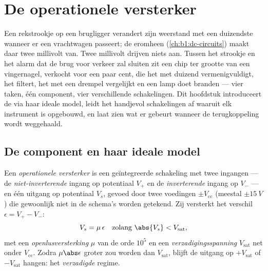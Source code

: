 \chapter{De operationele versterker}\label{ch:b1:operational-amplifier}

Een rekstrookje op een brugligger verandert zijn weerstand met een
duizendste wanneer er een vrachtwagen passeert; de  eromheen
(\cref{ch:b1:dc-circuits}) maakt daar twee millivolt van. Twee
millivolt drijven niets aan. Tussen het strookje en het alarm dat de brug voor
verkeer zal sluiten zit een chip ter grootte van een vingernagel, verkocht
voor een paar cent, die het  met duizend vermenigvuldigt, het filtert,
het met een drempel vergelijkt en een lamp doet branden --- vier taken, één
component, vier verschillende schakelingen. Dit hoofdstuk introduceert de
 via haar ideale model, leidt het handjevol
schakelingen af waaruit elk instrument is opgebouwd, en laat zien wat er gebeurt
wanneer de terugkoppeling wordt weggehaald.

\section{De component en haar ideale model}

\begin{definition}\label{def:b1:operational-amplifier:opamp}
Een \emph{operationele versterker} is een geïntegreerde schakeling met twee
ingangen --- de \emph{niet-inverterende} ingang op potentiaal $V_+$ en de
\emph{inverterende} ingang op $V_-$ --- en één uitgang op potentiaal $V_s$,
gevoed door twee voedingen $\pm V_{\mathrm{cc}}$ (meestal
$\pm\qty{15}{V}$) die gewoonlijk niet in de schema's worden getekend. Zij versterkt
het verschil $\epsilon = V_+ - V_-$:
\[
V_s = \mu\,\epsilon \quad\text{zolang } \abs{V_s} < V_{\mathrm{sat}},
\]
met een \emph{openlusversterking} $\mu$ van de orde $10^5$ en een
\emph{verzadigingsspanning} $V_{\mathrm{sat}}$ net onder
$V_{\mathrm{cc}}$. Zodra $\mu\abs\epsilon$ groter zou worden dan $V_{\mathrm{sat}}$,
blijft de uitgang op $+V_{\mathrm{sat}}$ of $-V_{\mathrm{sat}}$ hangen: het
\emph{verzadigde} regime.
\end{definition}

